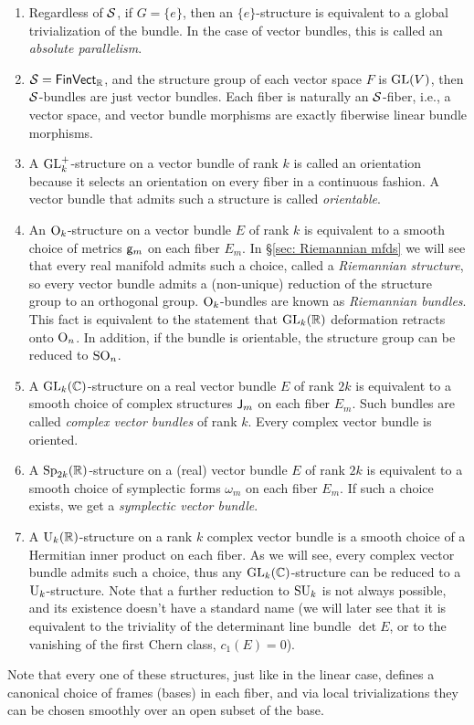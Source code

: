 \begin{example}
    \begin{enumerate}
        \item Regardless of $\mathcal{S}$, if $G=\{e\}$, then an $\{e\}$-structure is equivalent to a global trivialization of the bundle. In the case of vector bundles, this is called an \emph{absolute parallelism}.
        \item $\mathcal{S}=\mathsf{FinVect}_{\mathbb{R}}$, and the structure group of each vector space $F$ is $\operatorname{GL}(V)$, then $\mathcal{S}$-bundles are just vector bundles. Each fiber is naturally an $\mathcal{S}$-fiber, i.e., a vector space, and vector bundle morphisms are exactly fiberwise linear bundle morphisms.
        \item A $\operatorname{GL}_k^+$-structure on a vector bundle of rank $k$ is called an orientation because it selects an orientation on every fiber in a continuous fashion. A vector bundle that admits such a structure is called \emph{orientable}.
        \item An $\operatorname{O}_k$-structure on a vector bundle $E$ of rank $k$ is equivalent to a smooth choice of metrics $\mathsf{g}_m$ on each fiber $E_m$. In \S\ref{sec: Riemannian mfds} we will see that every real manifold admits such a choice, called a \emph{Riemannian structure}, so every vector bundle admits a (non-unique) reduction of the structure group to an orthogonal group. $\operatorname{O}_k$-bundles are known as \emph{Riemannian bundles}. This fact is equivalent to the statement that $\operatorname{GL}_k(\mathbb{R})$ deformation retracts onto $\operatorname{O}_n$. In addition, if the bundle is orientable, the structure group can be reduced to $\operatorname{SO}_n$.
        \item A $\operatorname{GL}_k(\mathbb{C})$-structure on a real vector bundle $E$ of rank $2k$ is equivalent to a smooth choice of complex structures $\mathsf{J}_m$ on each fiber $E_m$. Such bundles are called \emph{complex vector bundles} of rank $k$. Every complex vector bundle is oriented.
        \item A $\operatorname{Sp}_{2k}(\mathbb{R})$-structure on a (real) vector bundle $E$ of rank $2k$ is equivalent to a smooth choice of symplectic forms $\omega_m$ on each fiber $E_m$. If such a choice exists, we get a \emph{symplectic vector bundle}.
        \item A $\operatorname{U}_k(\mathbb{R})$-structure on a rank $k$ complex vector bundle is a smooth choice of a Hermitian inner product on each fiber. As we will see, every complex vector bundle admits such a choice, thus any $\operatorname{GL}_k(\mathbb{C})$-structure can be reduced to a $\operatorname{U}_k$-structure. Note that a further reduction to $\operatorname{SU}_k$ is not always possible, and its existence doesn't have a standard name (we will later see that it is equivalent to the triviality of the determinant line bundle $\det E$, or to the vanishing of the first Chern class, $c_1(E)=0$).
    \end{enumerate}
    Note that every one of these structures, just like in the linear case, defines a canonical choice of frames (bases) in each fiber, and via local trivializations they can be chosen smoothly over an open subset of the base. 
\end{example}

